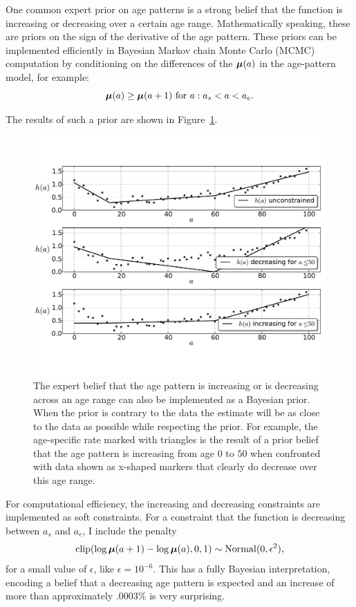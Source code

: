 One common expert prior on age patterns is a strong belief that the
function is increasing or decreasing over a certain age
range. Mathematically speaking, these are priors on the sign of the
derivative of the age pattern.  These priors can be implemented efficiently in
Bayesian Markov chain Monte Carlo (MCMC) computation by conditioning on the differences of the
$\boldsymbol{\mu}(a)$ in the age-pattern model, for example:
\[
\boldsymbol{\mu}(a) \geq \boldsymbol{\mu}(a+1) \text{ for } a : a_s < a < a_e.
\]

The results of such a prior are shown in
Figure~\ref{monotone-age-pattern}.


\begin{figure}[h]
\begin{center}
\includegraphics[width=\textwidth]{monotone-smoothing-splines.pdf}
\caption{The expert belief that the age pattern is increasing or is
  decreasing across an age range can also be implemented as a Bayesian
  prior.  When the prior is contrary to the data the estimate will be
  as close to the data as possible while respecting the prior.  For
  example, the age-specific rate marked with triangles is the result
  of a prior belief that the age pattern is increasing from age $0$ to
  $50$ when confronted with data shown as x-shaped markers that
  clearly do decrease over this age range.}
\label{monotone-age-pattern}
\end{center}
\end{figure}


For computational efficiency, the increasing and decreasing
constraints are implemented as soft constraints.  For a constraint
that the function is decreasing between $a_s$ and $a_e$, I include the penalty
\[
\operatorname{clip}(\log \boldsymbol{\mu}(a+1) - \log \boldsymbol{\mu}(a), 0, 1) \sim \operatorname{Normal}(0, \epsilon^2),
\]
for a small value of $\epsilon$, like $\epsilon = 10^{-6}$.  This has
a fully Bayesian interpretation, encoding a belief that a decreasing age pattern is expected
and an increase of more than approximately .0003\% is very surprising.


